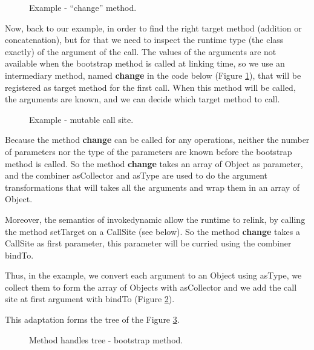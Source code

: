 \documentclass{sig-alternate}
\begin{document}
      \begin{figure}[!h]
        \centering \vspace{-1.5em}
        \caption{Example - ``change'' method.}\vspace{-.7em}
        \label{fooCHANGE}
      \end{figure}

      Now, back to our example, in order to find the right target method (addition or concatenation),
      but for that we need to inspect the runtime type (the class exactly) of the argument of the call.
      The values of the arguments are not available when the bootstrap method is called at linking time,
      so we use an intermediary method, named {\bf change} in the code below (Figure \ref{fooCHANGE}),
      that will be registered as target method for the first call.
      When this method will be called, the arguments are known, and we can decide which target method to call.

      \begin{figure}[!h]
        \centering \vspace{-1.5em}
        \caption{Example - mutable call site.}\vspace{-.25em}
        \label{fooMCS}
      \end{figure}

      Because the method {\bf change} can be called for any operations, neither the number of parameters nor the type
      of the parameters are known before the bootstrap method is called. So the method {\bf change} takes an array of
      Object as parameter, and the combiner asCollector and asType are used to do the argument transformations
      that will takes all the arguments and wrap them in an array of Object.

      Moreover, the semantics of invokedynamic allow the runtime to relink, by calling the method setTarget
      on a CallSite (see below). So the method {\bf change} takes a CallSite as first parameter, this parameter
      will be curried using the combiner bindTo.
       
      Thus, in the example, we convert each argument to an Object using asType,
      we collect them to form the array of Objects with asCollector and
      we add the call site at first argument with bindTo (Figure \ref{fooMCS}).

      \noindent This adaptation forms the tree of the Figure \ref{ast1}.

      \begin{figure}[!h]
        \centering \resizebox{.7\linewidth}{!}{}
        \caption{Method handles tree - bootstrap method.}\vspace{-1em}
        \label{ast1}
      \end{figure}
\end{document}
